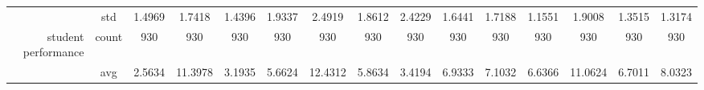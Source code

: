 \begin{table}[H]
{\begin{tabular}{rcccc|c|c|c|c|c|ccccc}
			                                                                               & std                                    & 1.4969                                                                             & 1.7418                                                                    & 1.4396                                                                    & 1.9337                                         & 2.4919                                                                    & 1.8612                                       & 2.4229                                      & 1.6441                                         & 1.7188                                         & 1.1551                                          & 1.9008                                          & 1.3515                                         & 1.3174                                         \\
			student performance                                                            & count                                  & 930                                                                                & 930                                                                       & 930                                                                       & 930                                            & 930                                                                       & 930                                          & 930                                         & 930                                            & 930                                            & 930                                             & 930                                             & 930                                            & 930                                            \\
			                                                                               & avg                                    & \cellcolor[rgb]{ .776,  .937,  .808}\textcolor[rgb]{ 0,  .38,  0}{2.5634}          & 11.3978                                                                   & 3.1935                                                                    & 5.6624                                         & 12.4312                                                                   & 5.8634                                       & 3.4194                                      & 6.9333                                         & 7.1032                                         & 6.6366                                          & 11.0624                                         & 6.7011                                         & 8.0323                                         \\

\end{tabular}}
\end{table}
